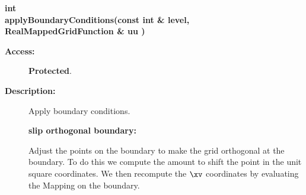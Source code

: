 \begin{flushleft} \textbf{%
int  \\ 
\settowidth{\EllipticGridGeneratorIncludeArgIndent}{applyBoundaryConditions(}%
applyBoundaryConditions(const int \& level,\\ 
\hspace{\EllipticGridGeneratorIncludeArgIndent}RealMappedGridFunction \& uu )
}\end{flushleft}
\begin{description}
\item[{\bf Access:}]  {\bf Protected}.
\item[{\bf Description:}] 
    Apply boundary conditions. 

  {\bf slip orthogonal boundary:}

  Adjust the points on the boundary to make the grid orthogonal at the boundary.
  To do this we compute the amount to shift the point in the unit square coordinates.
  We then recompute the $\xv$ coordinates by evaluating the Mapping on the boundary.


\end{description}
